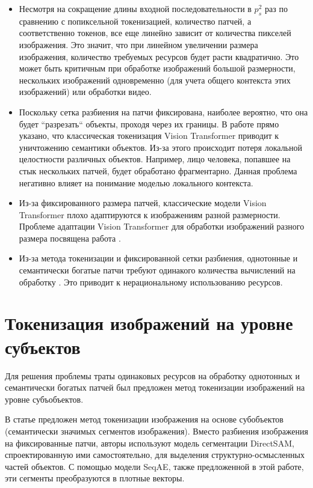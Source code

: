 \documentclass[times,specification,annotation]{itmo-student-thesis}
\begin{document}
\begin{itemize}
    \item Несмотря на сокращение длины входной последовательности в $p_s^2$ раз по сравнению с попиксельной токенизацией, количество патчей, а соответственно токенов, все еще линейно зависит от количества пикселей изображения. Это значит, что при линейном увеличении размера изображения, количество требуемых ресурсов будет расти квадратично. Это может быть критичным при обработке изображений большой размерности, нескольких изображений одновременно (для учета общего контекста этих изображений) или обработки видео.

    \item Поскольку сетка разбиения на патчи фиксирована, наиболее вероятно, что она будет ``разрезать`` объекты, проходя через их границы. В работе \cite{vit_patch_lack} прямо указано, что классическая токенизация Vision Transformer приводит к уничтожению семантики объектов. Из-за этого происходит потеря локальной целостности различных объектов. Например, лицо человека, попавшее на стык нескольких патчей, будет обработано фрагментарно. Данная проблема негативно влияет на понимание моделью локального контекста.
    
    \item Из-за фиксированного размера патчей, классические модели Vision Transformer плохо адаптируются к изображениям разной размерности. Проблеме адаптации Vision Transformer для обработки изображений разного размера посвящена работа \cite{vitar}.   

    \item Из-за метода токенизации и фиксированной сетки разбиения, однотонные и семантически богатые патчи требуют одинакого количества вычислений на обработку \cite{vit_patch_slimming}. Это приводит к нерациональному использованию ресурсов.
\end{itemize}

\section{Токенизация изображений на уровне субъектов}

Для решения проблемы траты одинаковых ресурсов на обработку однотонных и семантически богатых патчей был предложен метод токенизации изображений на уровне субъобъектов. 

В статье \cite{subobject_tokenization} предложен метод токенизации изображения на основе субобъектов (семантически значимых сегментов изображения). Вместо разбиения изображения на фиксированные патчи, авторы используют модель сегментации DirectSAM, спроектированную ими самостоятельно, для выделения структурно-осмысленных частей объектов. С помощью модели SeqAE, также предложенной в этой работе, эти сегменты преобразуются в плотные векторы.
\end{document}
